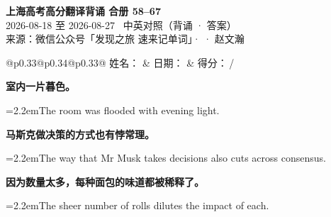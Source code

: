 \documentclass[11pt,a4paper]{article}
\newcommand{\num}[1]{\makebox[1.9em][r]{#1.}\hspace{0.3em}}
\begin{document}
\pagestyle{plain}
\begin{center}
{\LARGE\bfseries 上海高考高分翻译背诵 \quad 合册 58–67}\\[0.25em]
{\large 2026-08-18 至 2026-08-27 \quad\ 中英对照（背诵 · 答案）}\\[0.35em]
{\footnotesize 来源：微信公众号「发现之旅 速来记单词」·  · 赵文瀚}
\end{center}

\vspace{0.4em}
\noindent\begin{tabular}{@{}p{0.33\textwidth}@{}p{0.34\textwidth}@{}p{0.33\textwidth}@{}}
姓名：\underline{\hspace{2.0cm}} & 日期：\underline{\hspace{2.0cm}} & 得分：\underline{\hspace{1.4cm}}\,/ \\
\end{tabular}

\vspace{0.5em}

\vspace{0.8em}
\vspace{0.35em}\vspace{0.15em}

\begin{minipage}{\linewidth}

\num{1}\textbf{室内一片暮色。}

\vspace{0.15em}

\noindent\hangindent=2.2em\hspace{2.2em}The room was flooded with evening light.

\end{minipage}

\begin{minipage}{\linewidth}

\num{2}\textbf{马斯克做决策的方式也有悖常理。}

\vspace{0.15em}

\noindent\hangindent=2.2em\hspace{2.2em}The way that Mr Musk takes decisions also cuts across consensus.

\end{minipage}

\begin{minipage}{\linewidth}

\num{3}\textbf{因为数量太多，每种面包的味道都被稀释了。}

\vspace{0.15em}

\noindent\hangindent=2.2em\hspace{2.2em}The sheer number of rolls dilutes the impact of each.

\end{minipage}
\end{document}

